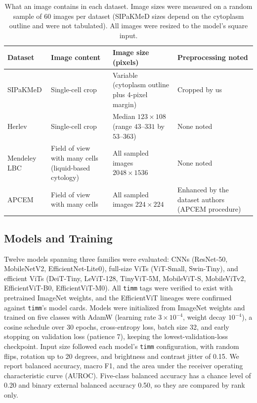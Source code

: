 \documentclass[12pt,letterpaper]{article}
\begin{document}
\begin{table}[htbp]
\centering
\caption{What an image contains in each dataset. Image sizes were measured on a random sample of 60 images per dataset (SIPaKMeD sizes depend on the cytoplasm outline and were not tabulated). All images were resized to the model's square input.}
\label{tab:units}
\footnotesize
\begin{tabular}{@{}p{2.3cm}p{4.2cm}p{3.4cm}p{3.3cm}@{}}
\toprule
Dataset & Image content & Image size (pixels) & Preprocessing noted \\
\midrule
SIPaKMeD & Single-cell crop & Variable (cytoplasm outline plus 4-pixel margin) & Cropped by us \\
Herlev & Single-cell crop & Median $123\times108$ (range $43$--$331$ by $53$--$363$) & None noted \\
Mendeley LBC & Field of view with many cells (liquid-based cytology) & All sampled images $2048\times1536$ & None noted \\
APCEM & Field of view with many cells & All sampled images $224\times224$ & Enhanced by the dataset authors (APCEM procedure) \\
\bottomrule
\end{tabular}
\end{table}

\subsection{Models and Training}
\label{sec:registry}
\label{sec:training}
Twelve models spanning three families were evaluated: CNNs (ResNet-50,\cite{he2016resnet} MobileNetV2,\cite{sandler2018mobilenetv2} EfficientNet-Lite0\cite{tan2019efficientnet}), full-size ViTs (ViT-Small,\cite{dosovitskiy2021vit} Swin-Tiny\cite{liu2021swin}), and efficient ViTs (DeiT-Tiny,\cite{touvron2021deit} LeViT-128,\cite{graham2021levit} TinyViT-5M,\cite{wu2022tinyvit} MobileViT-S,\cite{mehta2022mobilevit} MobileViTv2,\cite{mehta2022mobilevitv2} EfficientViT-B0,\cite{cai2023efficientvit} EfficientViT-M0\cite{liu2023efficientvit}). All \texttt{timm} tags were verified to exist with pretrained ImageNet weights, and the EfficientViT lineages were confirmed against \texttt{timm}'s model cards. Models were initialized from ImageNet weights and trained on five classes with AdamW (learning rate $3\times10^{-4}$, weight decay $10^{-4}$), a cosine schedule over 30 epochs, cross-entropy loss, batch size 32, and early stopping on validation loss (patience 7), keeping the lowest-validation-loss checkpoint. Input size followed each model's \texttt{timm} configuration, with random flips, rotation up to 20 degrees, and brightness and contrast jitter of 0.15. We report balanced accuracy, macro F1, and the area under the receiver operating characteristic curve (AUROC). Five-class balanced accuracy has a chance level of 0.20 and binary external balanced accuracy 0.50, so they are compared by rank only.
\end{document}
